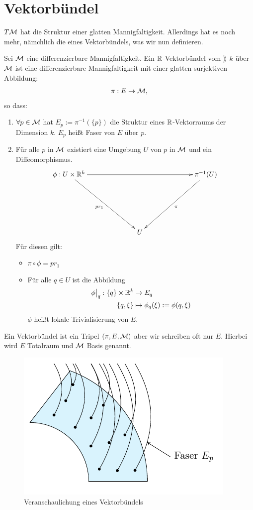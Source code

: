 \section{Vektorbündel}
$T\mathcal{M}$ hat die Struktur einer glatten Mannigfaltigkeit.
Allerdings hat es noch mehr, nämchlich die eines Vektorbündels, was wir nun definieren.
\begin{defs}[Vektorbündel]
Sei $\mathcal{M}$ eine differenzierbare Mannigfaltigkeit.
Ein $\mathbb{R}$-Vektorbündel vom $\rang$ $k$ über $\mathcal{M}$ ist eine differenzierbare Mannigfaltigkeit mit einer glatten surjektiven Abbildung:
\begin{align}
\pi: E \to \mathcal{M},
\end{align}
so dass:
\begin{enumerate}
\item $\forall p \in \mathcal{M}$ hat $E_p:= \pi^{-1}( \{ p \})$ die Struktur eines $\mathbb{R}$-Vektorraums der Dimension $k$.
$E_p$ heißt Faser von $E$ über $p$.
\item Für alle $p$ in $\mathcal{M}$ existiert eine Umgebung $U$ von $p$ in $\mathcal{M}$ und ein Diffeomorphismus.
\begin{align}
\begin{xy}
\xymatrix@=0.2\linewidth{
      \phi: U \times \R^k \ar[rr] \ar[rd]_{pr_1}  &     &  \pi^{-1}(U) \ar[dl]^{\pi}  \\
                             &  U  &}
\end{xy}
\end{align}
Für diesen gilt:
\begin{itemize}
\item $\pi \circ \phi = p r_1$
\item Für alle $q \in U$ ist die Abbildung
\begin{align}
\phi\big\vert_q : \{ q \} \times \mathbb{R}^k &\to E_q\\
\{ q, \xi \} &\mapsto \phi_q (\xi) := \phi(q, \xi)
\end{align}
$\phi$ heißt lokale Trivialisierung von $E$.
\end{itemize}
\end{enumerate}
\end{defs}
\begin{bem}
Ein Vektorbündel ist ein Tripel $(\pi, E, \mathcal{M})$ aber wir schreiben oft nur $E$. Hierbei wird $E$ Totalraum und $\mathcal{M}$ Basis genannt.
\end{bem}
\begin{figure}[H]
\centering
\includegraphics[scale=1.1]{figures/tikz/vectorbundel.pdf}
\caption{Veranschaulichung eines Vektorbündels}
\label{img:tangentialbuendel}
\end{figure}
